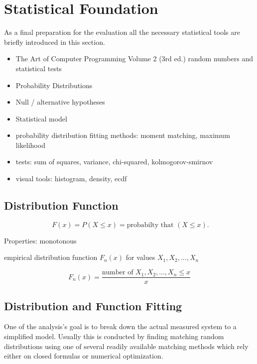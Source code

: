 \section{Statistical Foundation}

As a final preparation for the evaluation all the necessary statistical tools are briefly introduced in this section.

\begin{itemize}
\item The Art of Computer Programming Volume 2 (3rd ed.) random numbers and statistical tests\cite{Knuth:1997:ACP:270146}
\item Probability Distributions
\item Null / alternative hypotheses
\item Statistical model
\item probability distribution fitting
		methods: moment matching, maximum likelihood
\item tests: sum of squares, variance, chi-squared, kolmogorov-smirnov
\item visual tools: histogram, density, ecdf

\end{itemize}

\subsection{Distribution Function}

\begin{equation}
\phantom{.} F(x) = P(X\leq x) = \text{probabilty that } (X \leq x).
\end{equation}

Properties: monotonous

empirical distribution function $F_n(x)$ for values $X_1, X_2, ... , X_n$

\begin{equation}
F_n(x) = \frac{\text{number of }X_1, X_2, ... , X_n \leq x}{x}
\end{equation}


\subsection{Distribution and Function Fitting}

One of the analysis's goal is to break down the actual measured system to a simplified model. Usually this is conducted by finding matching random distributions using one of several readily available matching methods which rely either on closed formulas or numerical optimization.

